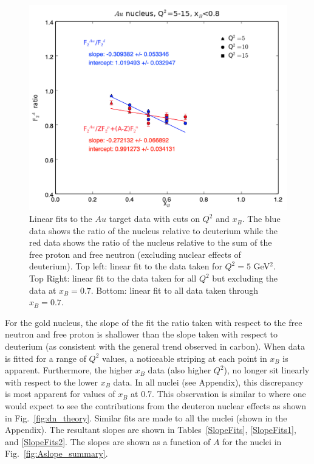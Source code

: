 \documentclass[oneside]{article}
\begin{document}
\begin{figure}
\begin{minipage}{0.5\textwidth}
\includegraphics[width=\textwidth]{plots/q2_all_x_all/all_Au.png}
\end{minipage}
  \caption[]{Linear fits to the $Au$ target data with cuts on $Q^2$ and $x_B$. The blue data shows the ratio of the nucleus relative to deuterium while the red data shows the ratio of the nucleus relative to the sum of the free proton and free neutron (excluding nuclear effects of deuterium). Top left: linear fit to the data taken for $Q^2=5$ GeV$^2$. Top Right: linear fit to the data taken for all $Q^2$ but excluding the data at $x_B=0.7$. Bottom: linear fit to all data taken through $x_B=0.7$.}
  \label{fig:fits_Au}
\end{figure}   

For the gold nucleus, the slope of the fit the ratio taken with respect to the free neutron and free proton is shallower than the slope taken with respect to deuterium (as consistent with the general trend observed in carbon). When data is fitted for a range of $Q^2$ values, a noticeable striping at each point in $x_B$ is apparent. Furthermore, the higher $x_B$ data (also higher $Q^2$), no longer sit linearly with respect to the lower $x_B$ data. In all nuclei (see Appendix), this discrepancy is most apparent for values of $x_B$ at 0.7. This observation is similar to where one would expect to see the contributions from the deuteron nuclear effects as shown in Fig.~\ref{fig:dn_theory}. Similar fits are made to all the nuclei (shown in the Appendix). The resultant slopes are shown in Tables~\ref{SlopeFits}, \ref{SlopeFits1}, and \ref{SlopeFits2}. The slopes are shown as a function of $A$ for the nuclei in  Fig.~\ref{fig:Aslope_summary}.
\end{document}
